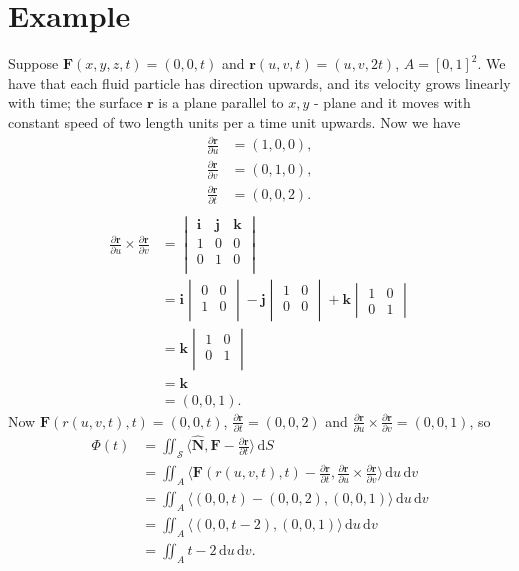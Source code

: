 \documentclass[12pt]{article}
\newcommand{\F}{\mathbf{F}}
\newcommand{\surf}{\mathbf{r}}
\newcommand{\N}{\hat{\mathbf{N}}}
\newcommand{\dr}{\partial \surf}
\newcommand{\du}{\partial u}
\newcommand{\dv}{\partial v}
\newcommand{\dt}{\partial t}
\newcommand{\dru}{\frac{\dr}{\du}}
\newcommand{\drv}{\frac{\dr}{\dv}}
\newcommand{\drt}{\frac{\dr}{\dt}}
\newcommand{\dS}{\,\mathrm{d}S}
\newcommand{\ii}{\mathbf{i}}
\newcommand{\jj}{\mathbf{j}}
\newcommand{\kk}{\mathbf{k}}
\newcommand{\ddu}{\, \mathrm{d}u}
\newcommand{\ddv}{\, \mathrm{d}v}
\begin{document}
\section*{Example}
Suppose $\F(x, y, z, t) = (0, 0, t)$ and $\surf(u, v, t) = (u, v, 2t)$, $A = \left[ 0, 1 \right]^2$. We have that each fluid particle has direction upwards, and its velocity grows linearly with time; the surface $\surf$ is a plane parallel to $x,y$ - plane and it moves with constant speed of two length units per a time unit upwards. Now we have
\begin{align*}
\dru &= (1, 0, 0), \\
\drv &= (0, 1, 0), \\
\drt &= (0, 0, 2). \\
\end{align*}
\begin{align*}
\dru \times \drv &= 
\begin{vmatrix}
\ii & \jj & \kk \\
1  & 0   & 0  \\
0  & 1   & 0 \\
\end{vmatrix} \\
      &= \ii \begin{vmatrix}
      0 & 0 \\
      1 & 0 \\
      \end{vmatrix}
      - \jj \begin{vmatrix}
      1 & 0 \\
      0 & 0 \\
      \end{vmatrix}
      + \kk \begin{vmatrix}
      1 & 0 \\
      0 & 1
      \end{vmatrix} \\
      &= \kk \begin{vmatrix}
      1 & 0 \\
      0 & 1 \\
      \end{vmatrix} \\
      &= \kk \\
      &= (0, 0, 1).
\end{align*}
Now $\F(r(u, v, t), t) = (0, 0, t)$, $\drt = (0, 0, 2)$ and $\dru \times \drv = (0, 0, 1)$, so
\begin{align*}
\Phi(t) &= \iint_{\mathscr{S}} \langle \N, \F - \drt \rangle \dS \\
          &= \iint_A \langle \F(r(u,v,t), t) - \drt, \dru \times \drv \rangle \ddu \ddv \\
          &= \iint_A \langle (0, 0, t) - (0, 0, 2), (0, 0, 1) \rangle \ddu \ddv \\
          &= \iint_A \langle (0, 0, t  - 2), (0, 0, 1) \rangle \ddu \ddv \\
          &= \iint_A t - 2 \ddu \ddv.
\end{align*}
\end{document}
